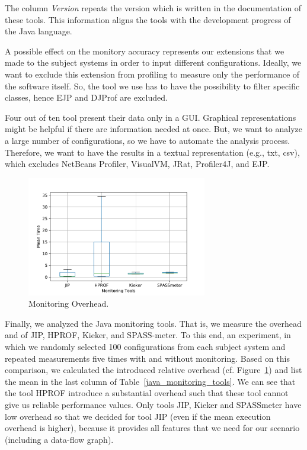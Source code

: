 The column \textit{Version} repeats the version which is written in the documentation of these tools. This information aligns the tools with the development progress of the Java language.

A possible effect on the monitory accuracy represents our extensions that we made to the subject systems in order to input different configurations. Ideally, we want to exclude this extension from profiling to measure only the performance of the software itself. So, the tool we use has to have the possibility to filter specific classes, hence EJP and DJProf are excluded.

Four out of ten tool present their data only in a \ac{GUI}. Graphical representations might be helpful if there are information needed at once. But, we want to analyze a large number of configurations, so we have to automate the analysis process. Therefore, we want to have the results in a textual representation (e.g., txt, csv), which excludes NetBeans Profiler, VisualVM, JRat, Profiler4J, and EJP. 


\begin{figure}[h]
  \centering
  \includegraphics[width=0.7\textwidth]{images/porfiling_tools_overhead_only_Prof}
  \caption{Monitoring Overhead.}
  \label{fig:prof_tools_analysis}
\end{figure}

Finally, we analyzed the Java monitoring tools. That is, we measure the overhead and of JIP, HPROF, Kieker, and SPASS-meter. To this end, an experiment, in which we randomly selected 100 configurations from each subject system and repeated measurements five times with and without monitoring. Based on this comparison, we calculated the introduced relative overhead (cf. Figure~\ref{fig:prof_tools_analysis}) and list the mean in the last column of Table~\ref{java_monitoring_tools}.
We can see that the tool HPROF introduce a substantial overhead such that these tool cannot give us reliable performance values. Only tools JIP, Kieker and SPASSmeter have low overhead so that we decided for tool JIP (even if the mean execution overhead is higher), because it provides all features that we need for our scenario (including a data-flow graph).

